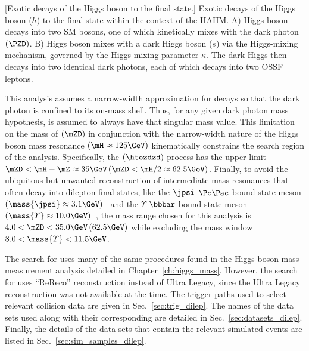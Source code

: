 \begin{multiFigure}
        \centering
            [Exotic decays of the Higgs boson to the \fourl final state.]
            {Exotic decays of the Higgs boson ($h$) to the \fourl final state within the context of the HAHM.
            A) Higgs boson decays into two SM \PZ bosons, one of which kinetically mixes with the dark photon $\left(\PZD\right)$.
            B) Higgs boson mixes with a dark Higgs boson ($s$) via the Higgs-mixing mechanism, governed by the Higgs-mixing parameter $\kappa$.
            The dark Higgs then decays into two identical dark photons, each of which decays into two OSSF leptons.}
        \label{fig:feyn_diag_hzzd4l_hzdzd4l}
\end{multiFigure}

This analysis assumes a narrow-width approximation for \PZD decays so that the dark photon is confined to its on-mass shell.
Thus, for any given dark photon mass hypothesis, \PZD is assumed to always have that singular mass value.
This limitation on the mass of \PZD $\left(\mZD\right)$ in conjunction with the narrow-width nature of the Higgs boson mass resonance $\left( \mH \approx 125\GeV \right)$ kinematically constrains the search region of the analysis.
Specifically, the \htozzd $\left(\htozdzd\right)$ process has the upper limit
$\mZD < \mH - \mZ \approx 35\GeV    \left(\mZD < \mH / 2 \approx 62.5\GeV\right)$.
Finally, to avoid the ubiquitous but unwanted reconstruction of intermediate mass resonances that often decay into dilepton final states,
like the $\jpsi$ $\Pc\Pac$ bound state meson $\left( \mass{\jpsi} \approx 3.1\GeV \right)$~\cite{particle_data_group_review_2020}
and the $\varUpsilon$ $\bbbar$ bound state meson $\left( \mass{\varUpsilon} \approx 10.0\GeV \right)$~\cite{particle_data_group_review_2020},
the mass range chosen for this analysis is $4.0 < \mZD < 35.0\GeV \left(62.5\GeV\right)$ while excluding the mass window $8.0 < \mass{\varUpsilon} < 11.5\GeV$.

The search for \PZD uses many of the same procedures found in the Higgs boson mass measurement analysis detailed in Chapter~\ref{ch:higgs_mass}.
However, the search for \PZD uses ``ReReco'' reconstruction instead of Ultra Legacy, since the Ultra Legacy reconstruction was not available at the time.
The trigger paths used to select relevant \pp collision data are given in Sec.~\ref{sec:trig_dilep}.
The names of the data sets used along with their corresponding \lumiint are detailed in Sec.~\ref{sec:datasets_dilep}.
Finally, the details of the data sets that contain the relevant simulated events are listed in Sec.~\ref{sec:sim_samples_dilep}.

